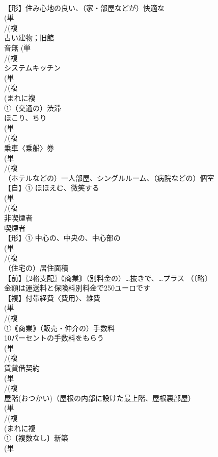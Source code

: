 \documentclass[8pt]{extreport}
\begin{document}
\begin{CJK}{UTF8}{min}
\\	【形】住み心地の良い、（家・部屋などが）快適な 
\\	(単
\\	/(複
\\	古い建物；旧館 
\\	音無	(単
\\	/(複
\\	システムキッチン 
\\	(単
\\	/(複
\\	(まれに複
\\	①（交通の）渋滞 
\\	ほこり、ちり
\\	(単
\\	/(複
\\	乗車〈乗船〉券 
\\	(単
\\	/(複
\\	（ホテルなどの）一人部屋、シングルルーム、（病院などの）個室 
\\	【自】① ほほえむ、微笑する 
\\	(単
\\	/(複
\\	非喫煙者 
\\	喫煙者
\\	【形】① 中心の、中央の、中心部の 
\\	(単
\\	/(複
\\	（住宅の）居住面積 
\\	【前】〖2格支配〗｟商業｠（別料金の）…抜きで、…プラス （〔略〕
\\	金額は運送料と保険料別料金で250ユーロです
\\	【複】付帯経費〈費用〉、雑費 
\\	(単
\\	/(複
\\	①｟商業｠（販売・仲介の）手数料 
\\	10パーセントの手数料をもらう 
\\	(単
\\	/(複
\\	賃貸借契約 
\\	(単
\\	/(複
\\	屋階(おつかい)（屋根の内部に設けた最上階、屋根裏部屋） 
\\	(単
\\	/(複
\\	(まれに複
\\	①〔複数なし〕新築 
\\	(単

\end{CJK}
\end{document}
